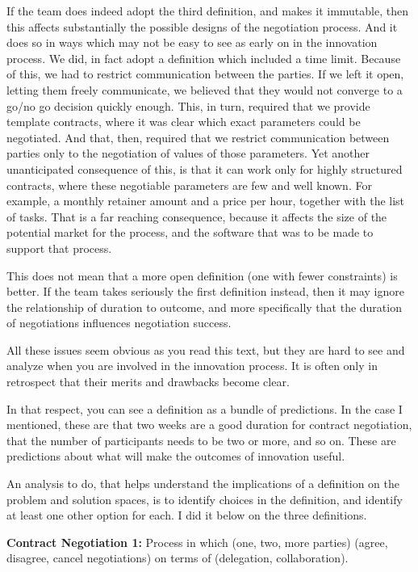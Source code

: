 If the team does indeed adopt the third definition, and makes it immutable, then this affects substantially the possible designs of the negotiation process. And it does so in ways which may not be easy to see as early on in the innovation process. We did, in fact adopt a definition which included a time limit. Because of this, we had to restrict communication between the parties. If we left it open, letting them freely communicate, we believed that they would not converge to a go/no go decision quickly enough. This, in turn, required that we provide template contracts, where it was clear which exact parameters could be negotiated. And that, then, required that we restrict communication between parties only to the negotiation of values of those parameters. Yet another unanticipated consequence of this, is that it can work only for highly structured contracts, where these negotiable parameters are few and well known. For example, a monthly retainer amount and a price per hour, together with the list of tasks. That is a far reaching consequence, because it affects the size of the potential market for the process, and the software that was to be made to support that process.

This does not mean that a more open definition (one with fewer constraints) is better. If the team takes seriously the first definition instead, then it may ignore the relationship of duration to outcome, and more specifically that the duration of negotiations influences negotiation success.

All these issues seem obvious as you read this text, but they are hard to see and analyze when you are involved in the innovation process. It is often only in retrospect that their merits and drawbacks become clear.

In that respect, you can see a definition as a bundle of predictions. In the case I mentioned, these are that two weeks are a good duration for contract negotiation, that the number of participants needs to be two or more, and so on. These are predictions about what will make the outcomes of innovation useful.

An analysis to do, that helps understand the implications of a definition on the problem and solution spaces, is to identify choices in the definition, and identify at least one other option for each. I did it below on the three definitions.

\begin{svgraybox}
\textbf{Contract Negotiation 1:} Process in which (one, two, more parties) (agree, disagree, cancel negotiations) on terms of (delegation, collaboration).
\end{svgraybox}

